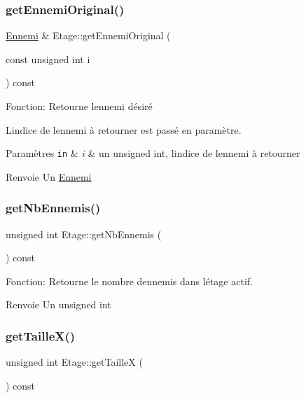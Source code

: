 \subsubsection{\texorpdfstring{get\+Ennemi\+Original()}{getEnnemiOriginal()}}
{\footnotesize\ttfamily \mbox{\hyperlink{classEnnemi}{Ennemi}} \& Etage\+::get\+Ennemi\+Original (\begin{DoxyParamCaption}\item[{const unsigned int}]{i }\end{DoxyParamCaption}) const}



Fonction\+: Retourne l\textquotesingle{}ennemi désiré 

L\textquotesingle{}indice de l\textquotesingle{}ennemi à retourner est passé en paramètre. 
\begin{DoxyParams}[1]{Paramètres}
\mbox{\tt in}  & {\em i} & un unsigned int, l\textquotesingle{}indice de l\textquotesingle{}ennemi à retourner \\
\hline
\end{DoxyParams}
\begin{DoxyReturn}{Renvoie}
Un \mbox{\hyperlink{classEnnemi}{Ennemi}} 
\end{DoxyReturn}
\mbox{\label{classEtage_a94fadf180dbb582505f45b4028b26e13}} 
\subsubsection{\texorpdfstring{get\+Nb\+Ennemis()}{getNbEnnemis()}}
{\footnotesize\ttfamily unsigned int Etage\+::get\+Nb\+Ennemis (\begin{DoxyParamCaption}{ }\end{DoxyParamCaption}) const}



Fonction\+: Retourne le nombre d\textquotesingle{}ennemis dans l\textquotesingle{}étage actif. 

\begin{DoxyReturn}{Renvoie}
Un unsigned int 
\end{DoxyReturn}
\mbox{\label{classEtage_a7edb87ab5d81a15170217960d08bc310}} 
\subsubsection{\texorpdfstring{get\+Taille\+X()}{getTailleX()}}
{\footnotesize\ttfamily unsigned int Etage\+::get\+TailleX (\begin{DoxyParamCaption}{ }\end{DoxyParamCaption}) const}



